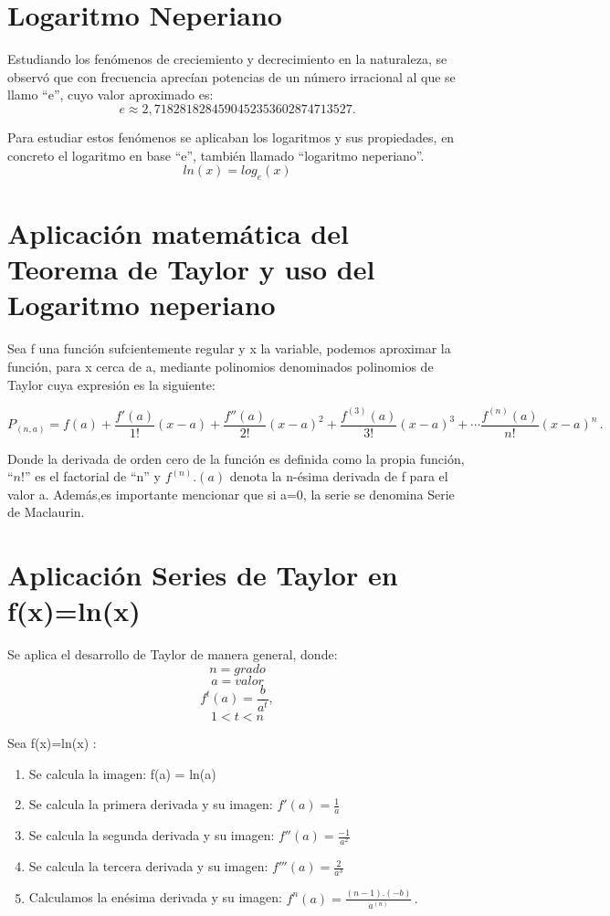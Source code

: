 \documentclass[spanish,a4paper,11pt,twoside]{report}
\begin{document}
\section{Logaritmo Neperiano}
Estudiando los fenómenos de creciemiento y decrecimiento en la naturaleza, se observó que con frecuencia aprecían potencias de un número irracional al que se llamo ``e'', 
cuyo valor aproximado es:
 \[ e \approx 2,7182818284590452353602874713527. \] 

Para estudiar estos fenómenos se aplicaban los logaritmos y sus propiedades, en concreto el logaritmo en base ``e'', también llamado ``logaritmo neperiano''. 
\[ln(x)=log_e(x)\]
 
\section{Aplicación matemática del Teorema de Taylor y uso del Logaritmo neperiano}

Sea f una función sufcientemente regular y x la variable, podemos aproximar la función, para x cerca de a, mediante polinomios denominados polinomios de Taylor cuya expresión es la siguiente:


  \[ P_{(n,a)} = f(a)+\frac{f'(a)}{1!}(x-a)+\frac{f''(a)}{2!}(x-a)^2+\frac{f^{(3)}(a)}{3!}(x-a)^3+\cdots \frac{f^{(n)}(a)}{n!} (x-a)^{n}\,. \]
  
Donde la derivada de orden cero de la función es definida como la propia función, ``$n!$'' es el factorial de ``n'' y  $f^{(n)}.(a)$ denota la n-ésima derivada de f para el valor a.
Además,es importante mencionar que si a=0, la serie se denomina Serie de Maclaurin. 

\emph{}

\section{Aplicación Series de Taylor en f(x)=ln(x)}

Se aplica el desarrollo de Taylor de manera general, donde:
\[n=grado\]
\[a=valor\]
\[f^t(a)= \frac{b}{a^t},\]
\small{\[1<t<n\]}

Sea f(x)=ln(x) :

\begin{enumerate}
\item Se calcula la imagen:
f(a) = ln(a)
\item Se calcula la primera derivada y su imagen:
$f'(a) = \frac{1}{a}$ 
\item Se calcula la segunda derivada y su imagen:
$f''(a) = \frac{-1}{a^2}$
\item Se calcula la tercera derivada y su imagen:
$f'''(a) = \frac{2}{a^3}$
\item Calculamos la enésima derivada y su imagen:
$f^n(a) = \frac{(n-1).(-b)}{a^{(n)}}\,.$
\end{enumerate}
\end{document}
